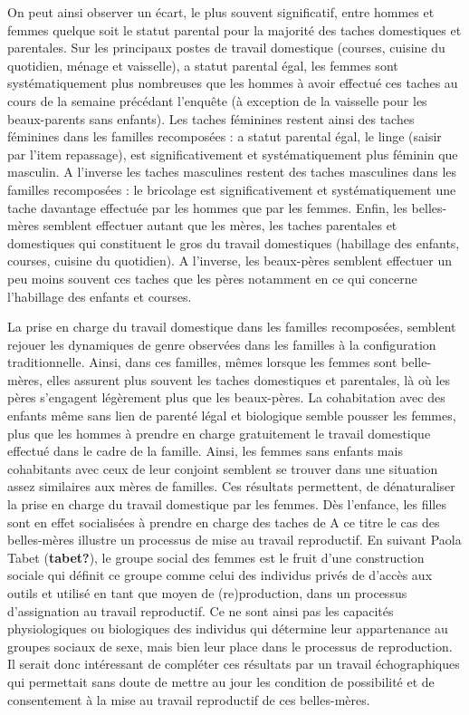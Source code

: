 \documentclass[
  12pt,
]{book}
\begin{document}
On peut ainsi observer un écart, le plus souvent significatif, entre
hommes et femmes quelque soit le statut parental pour la majorité des
taches domestiques et parentales. Sur les principaux postes de travail
domestique (courses, cuisine du quotidien, ménage et vaisselle), a
statut parental égal, les femmes sont systématiquement plus nombreuses
que les hommes à avoir effectué ces taches au cours de la semaine
précédant l'enquête (à exception de la vaisselle pour les beaux-parents
sans enfants). Les taches féminines restent ainsi des taches féminines
dans les familles recomposées : a statut parental égal, le linge (saisir
par l'item repassage), est significativement et systématiquement plus
féminin que masculin. A l'inverse les taches masculines restent des
taches masculines dans les familles recomposées : le bricolage est
significativement et systématiquement une tache davantage effectuée par
les hommes que par les femmes. Enfin, les belles-mères semblent
effectuer autant que les mères, les taches parentales et domestiques qui
constituent le gros du travail domestiques (habillage des enfants,
courses, cuisine du quotidien). A l'inverse, les beaux-pères semblent
effectuer un peu moins souvent ces taches que les pères notamment en ce
qui concerne l'habillage des enfants et courses.

La prise en charge du travail domestique dans les familles recomposées,
semblent rejouer les dynamiques de genre observées dans les familles à
la configuration traditionnelle. Ainsi, dans ces familles, mêmes lorsque
les femmes sont belle-mères, elles assurent plus souvent les taches
domestiques et parentales, là où les pères s'engagent légèrement plus
que les beaux-pères. La cohabitation avec des enfants même sans lien de
parenté légal et biologique semble pousser les femmes, plus que les
hommes à prendre en charge gratuitement le travail domestique effectué
dans le cadre de la famille. Ainsi, les femmes sans enfants mais
cohabitants avec ceux de leur conjoint semblent se trouver dans une
situation assez similaires aux mères de familles. Ces résultats
permettent, de dénaturaliser la prise en charge du travail domestique
par les femmes. Dès l'enfance, les filles sont en effet socialisées à
prendre en charge des taches de A ce titre le cas des belles-mères
illustre un processus de mise au travail reproductif. En suivant Paola
Tabet (\textbf{tabet?}), le groupe social des femmes est le fruit d'une
construction sociale qui définit ce groupe comme celui des individus
privés de d'accès aux outils et utilisé en tant que moyen de
(re)production, dans un processus d'assignation au travail reproductif.
Ce ne sont ainsi pas les capacités physiologiques ou biologiques des
individus qui détermine leur appartenance au groupes sociaux de sexe,
mais bien leur place dans le processus de reproduction. Il serait donc
intéressant de compléter ces résultats par un travail échographiques qui
permettait sans doute de mettre au jour les condition de possibilité et
de consentement à la mise au travail reproductif de ces belles-mères.
\end{document}
